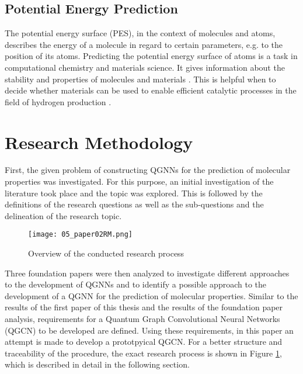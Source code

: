 \subsection{Potential Energy Prediction}
The potential energy surface (PES), in the context of molecules and atoms, describes the energy of a molecule in regard to certain parameters, e.g. to the position of its atoms.    
Predicting the potential energy surface of atoms is a task in computational chemistry and materials science. It gives information about the stability and properties of molecules and materials \cite{liu_computational_2023}. This is helpful when to decide whether materials can be used to enable efficient catalytic processes in the field of hydrogen production \cite{chen_waste-derived_2023}. 

\section{Research Methodology}

First, the given problem of constructing QGNNs for the prediction of molecular properties was investigated. For this purpose, an initial investigation of the literature took place and the topic was explored. This is followed by the definitions of the research questions as well as the sub-questions and the delineation of the research topic. \\

\begin{figure}[h!]
    \centering
    \texttt{[image: 05\_paper02RM.png]}
    \caption[Overview of the conducted research process]{\label{img:paper02rm}{Overview of the conducted research process}}
    \end{figure} 

Three foundation papers were then analyzed to investigate different approaches to the development of QGNNs and to identify a possible approach to the development of a QGNN for the prediction of molecular properties. Similar to the results of the first paper of this thesis and the results of the foundation paper analysis, requirements for a Quantum Graph Convolutional Neural Networks (QGCN) to be developed are defined. Using these requirements, in this paper an attempt is made to develop a prototpyical QGCN. For a better structure and traceability of the procedure, the exact research process is shown in Figure \ref{img:paper02rm}, which is described in detail in the following section. \\


